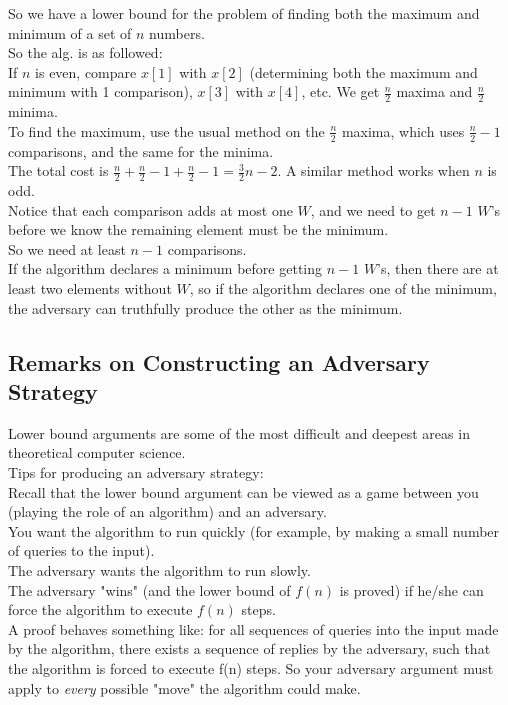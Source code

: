 \documentclass[12pt]{article}
\theoremstyle{plain}
\theoremstyle{definition}
\begin{document}
So we have a lower bound for the problem of finding both the maximum and minimum of a set of $n$ numbers. \\

So the alg. is as followed: \\
If $n$ is even, compare $x[1]$ with $x[2]$ (determining both the maximum and minimum with 1 comparison), $x[3]$ with $x[4]$, etc.
We get $\frac{n}{2}$ maxima and $\frac{n}{2}$ minima. \\
To find the maximum, use the usual method on the $\frac{n}{2}$ maxima, which uses $\frac{n}{2} - 1$ comparisons, and the same for the minima. \\
The total cost is $\frac{n}{2} + \frac{n}{2} - 1 + \frac{n}{2} - 1 = \frac{3}{2}n - 2$.
A similar method works when $n$ is odd. \\

Notice that each comparison adds at most one $W$, and we need to get $n-1$ $W$'s before we know the remaining element must be the minimum. \\
So we need at least $n-1$ comparisons. \\
If the algorithm declares a minimum before getting $n-1$ $W$'s, then there are at least two elements without $W$, so if the algorithm declares one of the minimum, the adversary can truthfully produce the other as the minimum.

\subsection{Remarks on Constructing an Adversary Strategy}
Lower bound arguments are some of the most difficult and deepest areas in theoretical computer science. \\

Tips for producing an adversary strategy: \\

Recall that the lower bound argument can be viewed as a game between you (playing the role of an algorithm) and an adversary. \\
You want the algorithm to run quickly (for example, by making a small number of queries to the input). \\
The adversary wants the algorithm to run slowly. \\
The adversary "wins" (and the lower bound of $f(n)$ is proved) if he/she can force the algorithm to execute $f(n)$ steps. \\

A proof behaves something like: for all sequences of queries into the input made by the algorithm, there exists a sequence of replies by the adversary, such that the algorithm is forced to execute f(n) steps.
So your adversary argument must apply to \emph{every} possible "move" the algorithm could make. \\
\end{document}
